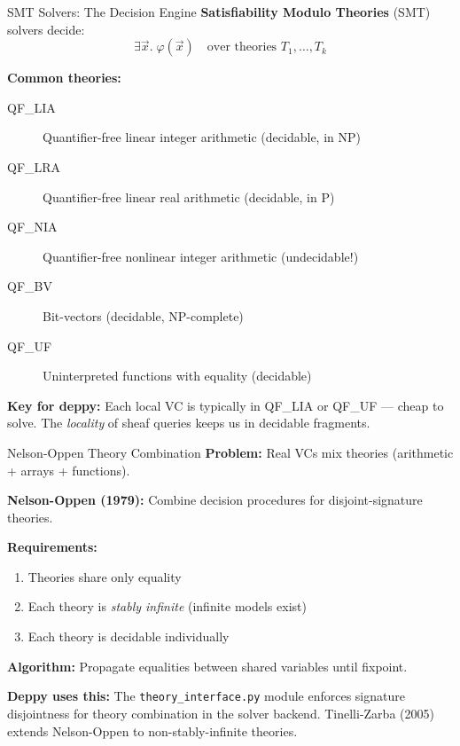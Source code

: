 \documentclass[aspectratio=169,10pt]{beamer}
\begin{document}
\begin{frame}{SMT Solvers: The Decision Engine}
\textbf{Satisfiability Modulo Theories} (SMT) solvers decide:
\[
\exists \vec{x}.\; \varphi(\vec{x}) \quad\text{over theories } T_1, \ldots, T_k
\]

\textbf{Common theories:}
\begin{description}
  \item[QF\_LIA] Quantifier-free linear integer arithmetic (decidable, in NP)
  \item[QF\_LRA] Quantifier-free linear real arithmetic (decidable, in P)
  \item[QF\_NIA] Quantifier-free nonlinear integer arithmetic (undecidable!)
  \item[QF\_BV] Bit-vectors (decidable, NP-complete)
  \item[QF\_UF] Uninterpreted functions with equality (decidable)
\end{description}

\vspace{0.3em}
\textbf{Key for deppy:} Each local VC is typically in QF\_LIA or QF\_UF --- cheap to solve. The \emph{locality} of sheaf queries keeps us in decidable fragments.
\end{frame}

\begin{frame}{Nelson-Oppen Theory Combination}
\textbf{Problem:} Real VCs mix theories (arithmetic + arrays + functions).

\vspace{0.3em}
\textbf{Nelson-Oppen (1979):} Combine decision procedures for disjoint-signature theories.

\textbf{Requirements:}
\begin{enumerate}
  \item Theories share only equality
  \item Each theory is \emph{stably infinite} (infinite models exist)
  \item Each theory is decidable individually
\end{enumerate}

\textbf{Algorithm:} Propagate equalities between shared variables until fixpoint.

\vspace{0.5em}
\textbf{Deppy uses this:} The \texttt{theory\_interface.py} module enforces signature disjointness for theory combination in the solver backend. Tinelli-Zarba (2005) extends Nelson-Oppen to non-stably-infinite theories.
\end{frame}
\end{document}
